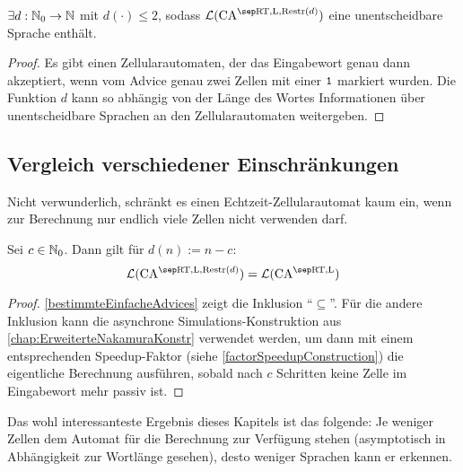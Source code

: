 \begin{satz}
    \label{einschraenkungUnentscheidbar}
    $\exists d: \mathbb{N}_0 \to \mathbb{N}$ mit $d(\cdot) \leq 2$, sodass $\CAL{\CART, \CALeft, \CARestr(d)}$ eine unentscheidbare Sprache enthält.
\end{satz}
\begin{proof}
    Es gibt einen Zellularautomaten, der das Eingabewort genau dann akzeptiert, wenn vom Advice genau zwei Zellen mit einer $\texttt{1}$ markiert wurden.
    Die Funktion $d$ kann so abhängig von der Länge des Wortes Informationen über unentscheidbare Sprachen an den Zellularautomaten weitergeben.
\end{proof}

\subsection{Vergleich verschiedener Einschränkungen}

Nicht verwunderlich, schränkt es einen Echtzeit-Zellularautomat kaum ein, wenn zur Berechnung nur endlich viele Zellen nicht verwenden darf.
\begin{satz}
    Sei $c \in \mathbb{N}_0$. Dann gilt für $d(n) := n - c$:
    \[
        \CAL{\CART, \CALeft, \CARestr(d)} = \CAL{\CART, \CALeft}
    \]
\end{satz}
\begin{proof}
    \cref{bestimmteEinfacheAdvices} zeigt die Inklusion \enquote{$\subseteq$}.
    Für die andere Inklusion kann die asynchrone Simulations-Konstruktion aus \cref{chap:ErweiterteNakamuraKonstr}
    verwendet werden, um dann mit einem entsprechenden Speedup-Faktor (siehe \cref{factorSpeedupConstruction})
    die eigentliche Berechnung ausführen, sobald nach $c$ Schritten keine Zelle im Eingabewort mehr passiv ist.
\end{proof}

Das wohl interessanteste Ergebnis dieses Kapitels ist das folgende: Je weniger Zellen dem Automat für die Berechnung zur
Verfügung stehen (asymptotisch in Abhängigkeit zur Wortlänge gesehen), desto weniger Sprachen kann er erkennen.

